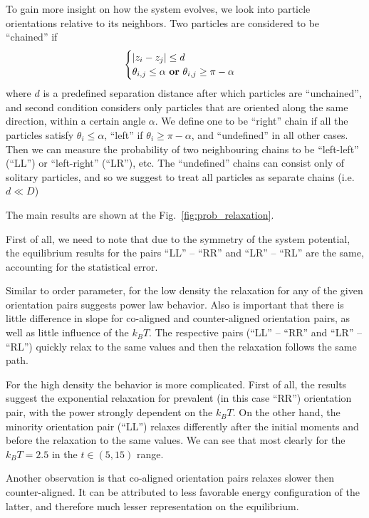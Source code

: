 To gain more insight on how the system evolves, we look into particle orientations relative to its neighbors.
Two particles are considered to be ``chained'' if 
\begin{equation}
\label{eq:chains_definition}
\begin{cases}
	|z_i - z_j| \leq d \\
	\theta_{i, j} \leq \alpha \text{ \textbf{or} } \theta_{i, j} \geq \pi - \alpha
\end{cases}
\end{equation}
where $d$ is a predefined separation distance after which particles are ``unchained'', and second condition considers only particles that are oriented along the same direction, within a certain angle $\alpha$. We define one to be ``right'' chain if all the particles satisfy $\theta_i \leq \alpha$, ``left'' if $\theta_i \geq \pi - \alpha$, and ``undefined'' in all other cases. Then we can measure the probability of two neighbouring chains to be ``left-left'' (``LL'') or ``left-right'' (``LR''), etc. The ``undefined'' chains can consist only of solitary particles, and so we suggest to treat all particles as separate chains (i.e. $d \ll D$)

The main results are shown at the Fig.~\ref{fig:prob_relaxation}.

First of all, we need to note that due to the symmetry of the system potential, the equilibrium results for the pairs ``LL'' -- ``RR'' and ``LR'' -- ``RL'' are the same, accounting for the statistical error.

Similar to order parameter, for the low density the relaxation for any of the given orientation pairs suggests power law behavior. Also is important that there is little difference in slope for co-aligned and counter-aligned orientation pairs, as well as little influence of the $k_BT$. The respective pairs (``LL'' -- ``RR'' and ``LR'' -- ``RL'') quickly relax to the same values and then the relaxation follows the same path.

For the high density the behavior is more complicated. First of all, the results suggest the exponential relaxation for prevalent (in this case ``RR'') orientation pair, with the power strongly dependent on the $k_BT$. On the other hand, the minority orientation pair (``LL'') relaxes differently after the initial moments and before the relaxation to the same values. We can see that most clearly for the $k_BT = 2.5$ in the $t \in (5, 15)$ range.

Another observation is that co-aligned orientation pairs relaxes slower then counter-aligned. It can be attributed to less favorable energy configuration of the latter, and therefore much lesser representation on the equilibrium.

